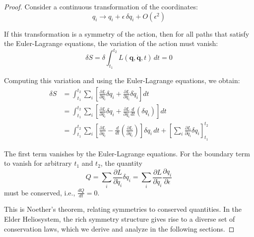 \begin{proof}
Consider a continuous transformation of the coordinates:
\begin{equation}
q_i \to q_i + \epsilon \, \delta q_i + O(\epsilon^2)
\end{equation}

If this transformation is a symmetry of the action, then for all paths that satisfy the Euler-Lagrange equations, the variation of the action must vanish:
\begin{equation}
\delta S = \delta \int_{t_1}^{t_2} L(\mathbf{q}, \dot{\mathbf{q}}, t) \, dt = 0
\end{equation}

Computing this variation and using the Euler-Lagrange equations, we obtain:
\begin{align}
\delta S &= \int_{t_1}^{t_2} \sum_i \left[ \frac{\partial L}{\partial q_i} \delta q_i + \frac{\partial L}{\partial \dot{q}_i} \delta \dot{q}_i \right] dt \\
&= \int_{t_1}^{t_2} \sum_i \left[ \frac{\partial L}{\partial q_i} \delta q_i + \frac{\partial L}{\partial \dot{q}_i} \frac{d}{dt}(\delta q_i) \right] dt \\
&= \int_{t_1}^{t_2} \sum_i \left[ \frac{\partial L}{\partial q_i} - \frac{d}{dt}\left(\frac{\partial L}{\partial \dot{q}_i}\right) \right] \delta q_i \, dt + \left[ \sum_i \frac{\partial L}{\partial \dot{q}_i} \delta q_i \right]_{t_1}^{t_2}
\end{align}

The first term vanishes by the Euler-Lagrange equations. For the boundary term to vanish for arbitrary $t_1$ and $t_2$, the quantity
\begin{equation}
Q = \sum_i \frac{\partial L}{\partial \dot{q}_i} \delta q_i = \sum_i \frac{\partial L}{\partial \dot{q}_i} \frac{\partial q_i}{\partial \epsilon}
\end{equation}
must be conserved, i.e., $\frac{dQ}{dt} = 0$.

This is Noether's theorem, relating symmetries to conserved quantities. In the Elder Heliosystem, the rich symmetry structure gives rise to a diverse set of conservation laws, which we derive and analyze in the following sections.
\end{proof}

